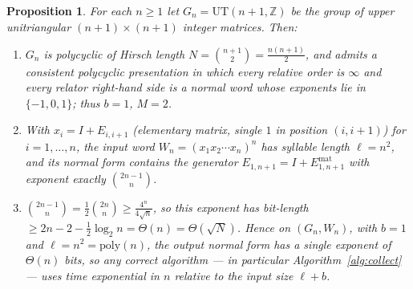 \documentclass{amsart}
\newtheorem{proposition}{Proposition}
\theoremstyle{definition}
\begin{document}
\begin{proposition}\label{prop:lower}
For each $n\ge1$ let $G_n=\mathrm{UT}(n+1,\mathbb Z)$ be the group of upper unitriangular
$(n+1)\times(n+1)$ integer matrices. Then:
\begin{enumerate}
\item $G_n$ is polycyclic of Hirsch length $N=\binom{n+1}{2}=\tfrac{n(n+1)}{2}$, and admits a
consistent polycyclic presentation in which every relative order is $\infty$ and every relator
right-hand side is a normal word whose exponents lie in $\{-1,0,1\}$; thus $b=1$, $M=2$.
\item With $x_i=I+E_{i,i+1}$ \textup{(}elementary matrix, single $1$ in position $(i,i+1)$\textup{)}
for $i=1,\dots,n$, the input word $W_n=(x_1x_2\cdots x_n)^{n}$ has syllable length $\ell=n^2$,
and its normal form contains the generator $E_{1,n+1}=I+E_{1,n+1}^{\mathrm{mat}}$ with exponent
exactly $\binom{2n-1}{n}$.
\item $\binom{2n-1}{n}=\tfrac12\binom{2n}{n}\ge\frac{4^{n}}{4\sqrt n}$, so this exponent has
bit-length $\ge 2n-2-\tfrac12\log_2 n=\Theta(n)=\Theta(\sqrt N)$. Hence on $(G_n,W_n)$, with
$b=1$ and $\ell=n^2=\mathrm{poly}(n)$, the output normal form has a single exponent of
$\Theta(n)$ bits, so any correct algorithm — in particular Algorithm~\ref{alg:collect} — uses
time exponential in $n$ relative to the input size $\ell+b$.
\end{enumerate}
\end{proposition}
\end{document}
